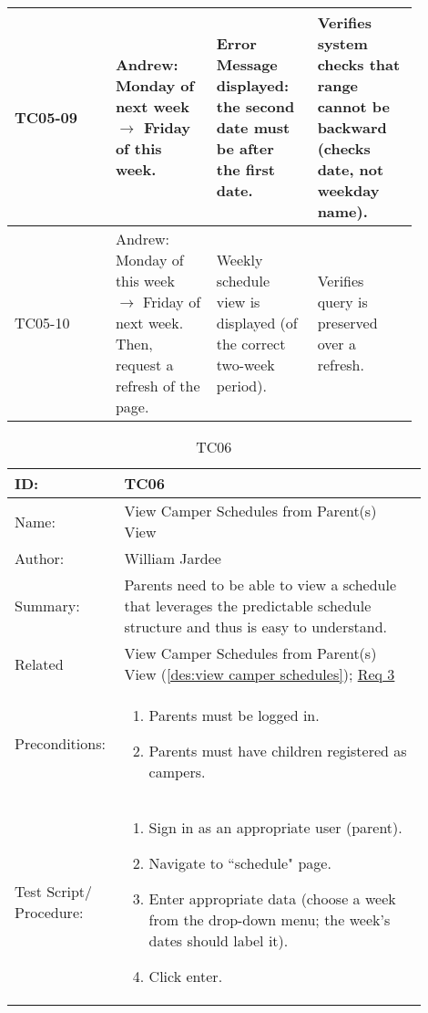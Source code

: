 \documentclass[11pt]{article}
\begin{document}
\begin{center}
\begin{longtable}{|p{0.22\linewidth}|p{0.22\linewidth}|p{0.22\linewidth}|p{0.22\linewidth}|}
	TC05-09 & Andrew: Monday of next week $\longrightarrow$ Friday of this week. & Error Message displayed: the second date must be after the first date. & Verifies system checks that range cannot be backward (checks date, not weekday name).\vspace*{1em}\\\hline
	TC05-10 & Andrew: Monday of this week $\longrightarrow$ Friday of next week. Then, request a refresh of the page. & Weekly schedule view is displayed (of the correct two-week period). & Verifies query is preserved over a refresh.\vspace*{1em}\\\hline
\end{longtable}
\end{center}


\begin{table}[H]
\begin{center}
\caption{TC06}
\label{TC06}
\begin{tabular}{p{0.20\linewidth}p{0.70\linewidth}}
	ID: & TC06\\\hline
	Name: & View Camper Schedules from Parent(s) View \\\hline
	Author: & William Jardee\\\hline
	Summary: & Parents need to be able to view a schedule that leverages the predictable schedule structure and thus is easy to understand. \\\hline
	Related \hspace{5em} & View Camper Schedules from Parent(s) View (\cref{des:view camper schedules}); \hyperlink{Req3}{Req 3}\\\hline
	Preconditions:& \begin{enumerate}[topsep=0pt] 
		\item Parents must be logged in.
		\item Parents must have children registered as campers.
	\end{enumerate}\\\hline
	Test Script/ Procedure: & \begin{enumerate}[topsep=0pt]
		\item Sign in as an appropriate user (parent).
		\item Navigate to ``schedule" page.
		\item Enter appropriate data (choose a week from the drop-down menu; the week's dates should label it).
		\item Click enter.
	\end{enumerate}\\\hline

\end{tabular}
\end{center}
\end{table}
\end{document}
